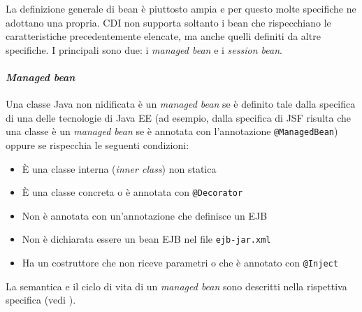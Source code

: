 La definizione generale di bean è piuttosto ampia e per questo molte specifiche ne adottano una propria. CDI non supporta soltanto i bean che rispecchiano le caratteristiche precedentemente elencate, ma anche quelli definiti da altre specifiche. I principali sono due: i \textit{managed bean} e i \textit{session bean}.

\paragraph{\textit{Managed bean}} Una classe Java non nidificata è un \textit{managed bean} se è definito tale dalla specifica di una delle tecnologie di Java EE (ad esempio, dalla specifica di JSF risulta che una classe è un \textit{managed bean} se è annotata con l'annotazione \lstinline{@ManagedBean}) oppure se rispecchia le seguenti condizioni:
\begin{itemize}
\item È una classe interna (\textit{inner class}) non statica
\item È una classe concreta o è annotata con \lstinline{@Decorator}
\item Non è annotata con un'annotazione che definisce un EJB
\item Non è dichiarata essere un bean EJB nel file \texttt{ejb-jar.xml}
\item Ha un costruttore che non riceve parametri o che è annotato con \lstinline{@Inject}
\end{itemize}

La semantica e il ciclo di vita di un \textit{managed bean} sono descritti nella rispettiva specifica (vedi \cite{managedBean}).

